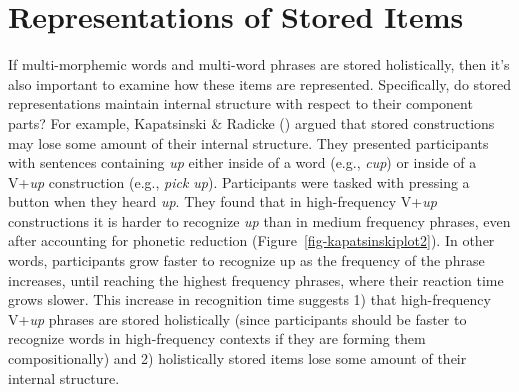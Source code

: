 \documentclass[
  12pt,
  letterpaper,
]{scrreport}
\begin{document}
\section{Representations of Stored
Items}\label{sec-representations-of-stored-items}

If multi-morphemic words and multi-word phrases are stored holistically,
then it's also important to examine how these items are represented.
Specifically, do stored representations maintain internal structure with
respect to their component parts? For example, Kapatsinski \& Radicke
() argued
that stored constructions may lose some amount of their internal
structure. They presented participants with sentences containing
\emph{up} either inside of a word (e.g., \emph{cup}) or inside of a
V+\emph{up} construction (e.g., \emph{pick up}). Participants were
tasked with pressing a button when they heard \emph{up}. They found that
in high-frequency V+\emph{up} constructions it is harder to recognize
\emph{up} than in medium frequency phrases, even after accounting for
phonetic reduction (Figure~\ref{fig-kapatsinskiplot2}). In other words,
participants grow faster to recognize up as the frequency of the phrase
increases, until reaching the highest frequency phrases, where their
reaction time grows slower. This increase in recognition time suggests
1) that high-frequency V+\emph{up} phrases are stored holistically
(since participants should be faster to recognize words in
high-frequency contexts if they are forming them compositionally) and 2)
holistically stored items lose some amount of their internal structure.
\end{document}
